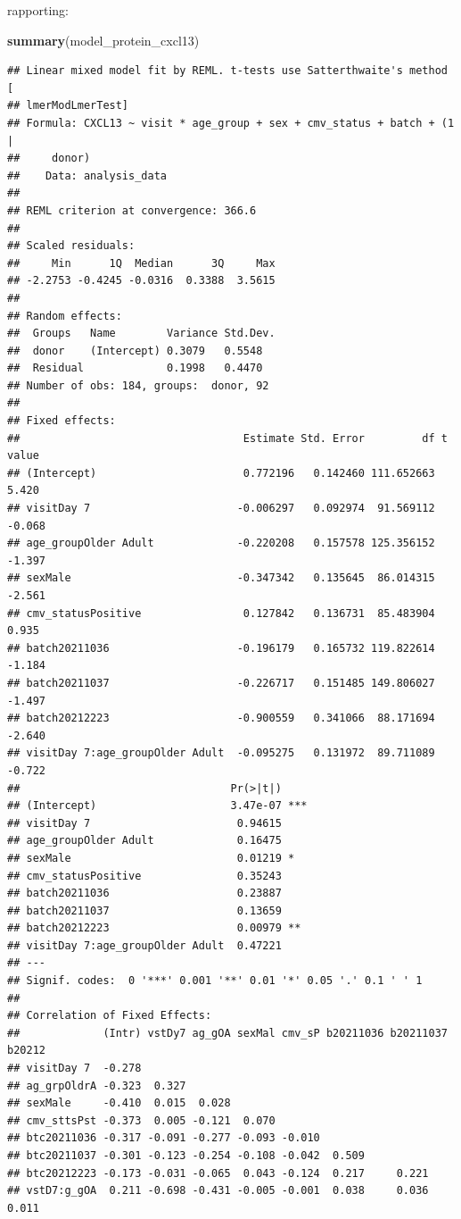 \documentclass[
]{article}
\newenvironment{Shaded}{\begin{snugshade}}{\end{snugshade}}
\newcommand{\FunctionTok}[1]{\textcolor[rgb]{0.13,0.29,0.53}{\textbf{#1}}}
\newcommand{\NormalTok}[1]{#1}
\begin{document}
rapporting:

\begin{Shaded}
\begin{Highlighting}[]
\FunctionTok{summary}\NormalTok{(model\_protein\_cxcl13)}
\end{Highlighting}
\end{Shaded}

\begin{verbatim}
## Linear mixed model fit by REML. t-tests use Satterthwaite's method [
## lmerModLmerTest]
## Formula: CXCL13 ~ visit * age_group + sex + cmv_status + batch + (1 |  
##     donor)
##    Data: analysis_data
## 
## REML criterion at convergence: 366.6
## 
## Scaled residuals: 
##     Min      1Q  Median      3Q     Max 
## -2.2753 -0.4245 -0.0316  0.3388  3.5615 
## 
## Random effects:
##  Groups   Name        Variance Std.Dev.
##  donor    (Intercept) 0.3079   0.5548  
##  Residual             0.1998   0.4470  
## Number of obs: 184, groups:  donor, 92
## 
## Fixed effects:
##                                   Estimate Std. Error         df t value
## (Intercept)                       0.772196   0.142460 111.652663   5.420
## visitDay 7                       -0.006297   0.092974  91.569112  -0.068
## age_groupOlder Adult             -0.220208   0.157578 125.356152  -1.397
## sexMale                          -0.347342   0.135645  86.014315  -2.561
## cmv_statusPositive                0.127842   0.136731  85.483904   0.935
## batch20211036                    -0.196179   0.165732 119.822614  -1.184
## batch20211037                    -0.226717   0.151485 149.806027  -1.497
## batch20212223                    -0.900559   0.341066  88.171694  -2.640
## visitDay 7:age_groupOlder Adult  -0.095275   0.131972  89.711089  -0.722
##                                 Pr(>|t|)    
## (Intercept)                     3.47e-07 ***
## visitDay 7                       0.94615    
## age_groupOlder Adult             0.16475    
## sexMale                          0.01219 *  
## cmv_statusPositive               0.35243    
## batch20211036                    0.23887    
## batch20211037                    0.13659    
## batch20212223                    0.00979 ** 
## visitDay 7:age_groupOlder Adult  0.47221    
## ---
## Signif. codes:  0 '***' 0.001 '**' 0.01 '*' 0.05 '.' 0.1 ' ' 1
## 
## Correlation of Fixed Effects:
##             (Intr) vstDy7 ag_gOA sexMal cmv_sP b20211036 b20211037 b20212
## visitDay 7  -0.278                                                       
## ag_grpOldrA -0.323  0.327                                                
## sexMale     -0.410  0.015  0.028                                         
## cmv_sttsPst -0.373  0.005 -0.121  0.070                                  
## btc20211036 -0.317 -0.091 -0.277 -0.093 -0.010                           
## btc20211037 -0.301 -0.123 -0.254 -0.108 -0.042  0.509                    
## btc20212223 -0.173 -0.031 -0.065  0.043 -0.124  0.217     0.221          
## vstD7:g_gOA  0.211 -0.698 -0.431 -0.005 -0.001  0.038     0.036     0.011
\end{verbatim}
\end{document}
